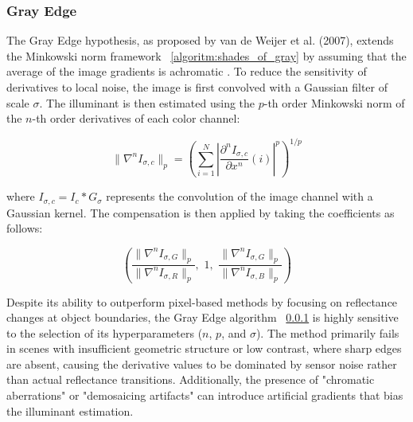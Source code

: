 \subsubsection{Gray Edge}
\label{algorithm:gray_edge}

The Gray Edge hypothesis, as proposed by van de Weijer et al. (2007), extends the Minkowski norm framework ~\ref{algoritm:shades_of_gray} by assuming that the average of the image gradients is achromatic \cite{gray_edge}. To reduce the sensitivity of derivatives to local noise, the image is first convolved with a Gaussian filter of scale $\sigma$. The illuminant is then estimated using the $p$-th order Minkowski norm of the $n$-th order derivatives of each color channel:

\begin{equation}
\| \nabla^n I_{\sigma,c} \|_p = \left( \sum_{i=1}^{N} \left| \frac{\partial^n I_{\sigma,c}}{\partial x^n} (i) \right|^p \right)^{1/p}
\end{equation}

where $I_{\sigma,c} = I_c * G_{\sigma}$ represents the convolution of the image channel with a Gaussian kernel. The compensation is then applied by taking the coefficients as follows:

\[
\left( \frac{\| \nabla^n I_{\sigma,G} \|_p}{\| \nabla^n I_{\sigma,R} \|_p}, \,\, 1, \,\, \frac{\| \nabla^n I_{\sigma,G} \|_p}{\| \nabla^n I_{\sigma,B} \|_p} \right)
\]

Despite its ability to outperform pixel-based methods by focusing on reflectance changes at object boundaries, the Gray Edge algorithm ~\ref{algorithm:gray_edge} is highly sensitive to the selection of its hyperparameters ($n$, $p$, and $\sigma$). The method primarily fails in scenes with insufficient geometric structure or low contrast, where sharp edges are absent, causing the derivative values to be dominated by sensor noise rather than actual reflectance transitions. Additionally, the presence of "chromatic aberrations" or "demosaicing artifacts" can introduce artificial gradients that bias the illuminant estimation.

